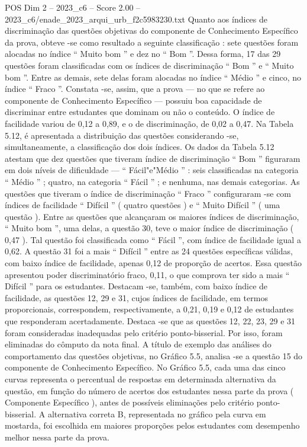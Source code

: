 \begin{textsample}{POS Dim 2 – 2023\_c6 – Score 2.00 – 2023\_c6/enade\_2023\_arqui\_urb\_f2c5983230.txt}
Quanto aos índices de discriminação das questões objetivas do componente de Conhecimento Específico da prova, obteve -se como resultado a seguinte classificação : sete questões foram alocadas no índice “ Muito bom ” e dez no “ Bom ”.
Dessa forma, 17 das 29 questões foram classificadas com os índices de discriminação “ Bom ” e “ Muito bom ”.
Entre as demais, sete delas foram alocadas no índice “ Médio ” e cinco, no índice “ Fraco ”.
Constata -se, assim, que a prova — no que se refere ao componente de Conhecimento Específico — possuiu boa capacidade de discriminar entre estudantes que dominam ou não o conteúdo.
O índice de facilidade variou de 0,12 a 0,89, e o de discriminação, de 0,02 a 0,47.
Na Tabela 5.12, é apresentada a distribuição das questões considerando -se, simultaneamente, a classificação dos dois índices.
Os dados da Tabela 5.12 atestam que dez questões que tiveram índice de discriminação “ Bom ” figuraram em dois níveis de dificuldade — “ Fácil"e"Médio ” : seis classificadas na categoria “ Médio ” ; quatro, na categoria “ Fácil ” ; e nenhuma, nas demais categorias.
As questões que tiveram o índice de discriminação “ Fraco ” configuraram -se com índices de facilidade “ Difícil ” ( quatro questões ) e “ Muito Difícil ” ( uma questão ).
Entre as questões que alcançaram os maiores índices de discriminação, “ Muito bom ”, uma delas, a questão 30, teve o maior índice de discriminação ( 0,47 ).
Tal questão foi classificada como “ Fácil ”, com índice de facilidade igual a 0,62.
A questão 31 foi a mais “ Difícil ” entre as 24 questões específicas válidas, com baixo índice de facilidade, apenas 0,12 de proporção de acertos.
Essa questão apresentou poder discriminatório fraco, 0,11, o que comprova ter sido a mais “ Difícil ” para os estudantes.
Destacam -se, também, com baixo índice de facilidade, as questões 12, 29 e 31, cujos índices de facilidade, em termos proporcionais, correspondem, respectivamente, a 0,21, 0,19 e 0,12 de estudantes que responderam acertadamente.
Destaca -se que as questões 12, 22, 23, 29 e 31 foram consideradas inadequadas pelo critério ponto-bisserial.
Por isso, foram eliminadas do cômputo da nota final.
A título de exemplo das análises do comportamento das questões objetivas, no Gráfico 5.5, analisa -se a questão 15 do componente de Conhecimento Específico.
No Gráfico 5.5, cada uma das cinco curvas representa o percentual de respostas em determinada alternativa da questão, em função do número de acertos dos estudantes nessa parte da prova ( Componente Específico ), antes de possíveis eliminações pelo critério ponto-bisserial.
A alternativa correta B, representada no gráfico pela curva em mostarda, foi escolhida em maiores proporções pelos estudantes com desempenho melhor nessa parte da prova.

\end{textsample}

